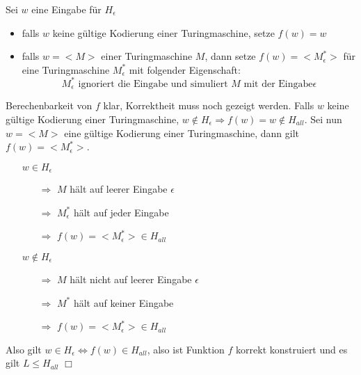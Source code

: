 \para{} Sei $w$ eine Eingabe für $H_\epsilon$
\begin{itemize}
	\item falls $w$ keine gültige Kodierung einer Turingmaschine, setze $f(w)=w$
	\item falls $w=<M>$ einer Turingmaschine $M$, dann setze $f(w)=<M_\epsilon^*>$ für eine Turingmaschine $M_\epsilon^*$ mit folgender Eigenschaft: $$ M_\epsilon^* \text{ ignoriert die Eingabe und simuliert } M \text{ mit der Eingabe} \epsilon $$
\end{itemize}
Berechenbarkeit von $f$ klar, Korrektheit muss noch gezeigt werden. Falls $w$ keine gültige Kodierung einer Turingmaschine, $w \not\in H_\epsilon \Rightarrow f(w)=w \not\in H_{all}$. Sei nun $w=<M>$ eine gültige Kodierung einer Turingmaschine, dann gilt $f(w)=<M_\epsilon^*>$.
\begin{itemize}
	\item[] $w \in H_\epsilon$
	\begin{itemize}
		\item[$\Rightarrow$] $M$ hält auf leerer Eingabe $\epsilon$
		\item[$\Rightarrow$] $M_\epsilon^*$ hält auf jeder Eingabe
		\item[$\Rightarrow$] $f(w)=<M_\epsilon^*> \in H_{all}$
	\end{itemize}
	\item[] $w \not\in H_\epsilon$
	\begin{itemize}
		\item[$\Rightarrow$] $M$ hält nicht auf leerer Eingabe $\epsilon$
		\item[$\Rightarrow$] $M^*$ hält auf keiner Eingabe
		\item[$\Rightarrow$] $f(w)=<M_\epsilon^*> \in H_{all}$
	\end{itemize}
\end{itemize}
Also gilt $w \in H_\epsilon \Leftrightarrow f(w) \in H_{all}$, also ist Funktion $f$ korrekt konstruiert und es gilt $L \leq H_{all}$ $\Box$ %